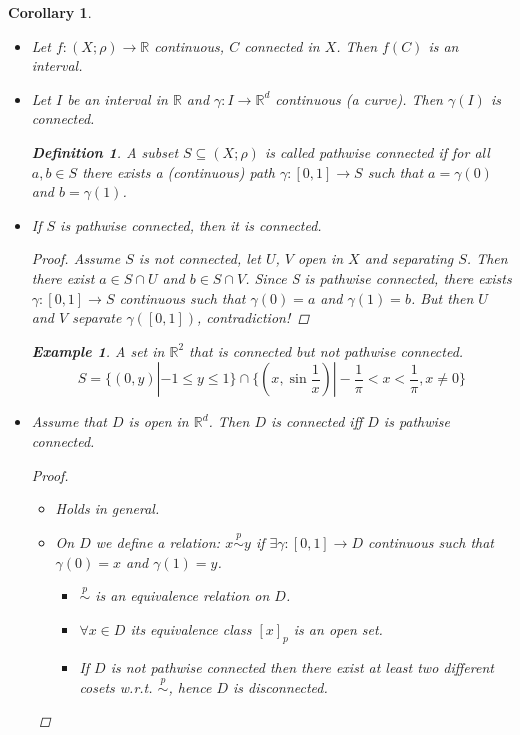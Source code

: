 \documentclass[12pt]{amsbook}
\newtheorem{corollary}[theorem]{Corollary}
\theoremstyle{definition}
\newtheorem{definition}[theorem]{Definition}
\newtheorem{example}[theorem]{Example}
\newcommand{\RR}{{\mathbb R}}
\newcommand{\Ra}{\Rightarrow} %
\newcommand{\La}{\Leftarrow} %
\newcommand{\ra}{\rightarrow} %
\begin{document}
\begin{corollary} %
\begin{itemize}
\item[(1)] Let $f: (X; \rho) \ra \RR$ continuous, $C$ connected in $X$. Then $f(C)$ is an interval.
\item[(2)] Let $I$ be an interval in $\RR$ and $\gamma: I \ra \RR^d$ continuous (a curve). Then $\gamma(I)$ is connected.

\begin{definition}
A subset $S \subseteq (X; \rho)$ is called \emph{pathwise connected} if for all $a, b \in S$ there exists a (continuous) path $\gamma: [0,1] \ra S$ such that $a = \gamma(0)$ and $b = \gamma(1)$.
\end{definition}

\item[(3)] If $S$ is pathwise connected, then it is connected.

\begin{proof}
Assume $S$ is not connected, let $U$, $V$ open in $X$ and separating $S$. Then there exist $a \in S \cap U$ and $b \in S \cap V$.
Since S is pathwise connected, there exists $\gamma: [0,1] \ra S$ continuous such that $\gamma(0) = a$ and $\gamma(1) = b$. But then $U$ and $V$ separate $\gamma([0,1])$, contradiction!
\end{proof}

\begin{example}
A set in $\RR^2$ that is connected but not pathwise connected.
\begin{equation*}
S = \{(0,y) | -1 \leq y \leq 1 \} \cap \{ (x, \sin \frac{1}{x}) | -\frac{1}{\pi} < x < \frac{1}{\pi}, x \neq 0 \} %
\end{equation*}
\end{example}

\item[(4)] Assume that $D$ is open in $\RR^d$. Then $D$ is connected iff $D$ is pathwise connected.

\begin{proof}

\begin{itemize}
\item["$\La$"] Holds in general.
\item["$\Ra$"] On $D$ we define a relation: $x \overset{p}\sim y$ if $\exists \gamma: [0,1] \ra D$ continuous such that $\gamma(0) = x$ and $\gamma(1) = y$.
\begin{itemize}
\item[$\bullet$] $\stackrel{p}\sim$ is an equivalence relation on $D$.
\item[$\bullet$] $\forall x \in D$ its equivalence class $[x]_p$ is an open set.
\item[$\bullet$] If $D$ is not pathwise connected then there exist at least two different cosets w.r.t. $\overset{p}\sim$, hence $D$ is disconnected.
\end{itemize}
\end{itemize}
\end{proof}
\end{itemize}
\end{corollary}
\end{document}
